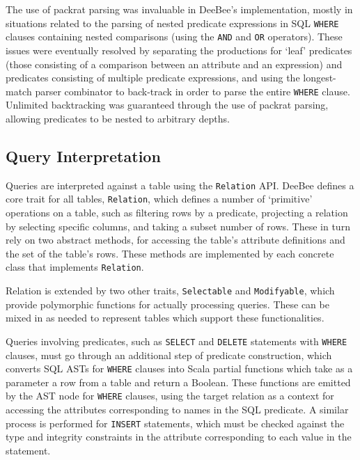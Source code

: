 The use of packrat parsing was invaluable in DeeBee's implementation, mostly in situations related to the parsing of nested predicate expressions in SQL \texttt{WHERE} clauses containing nested comparisons (using the \texttt{AND} and \texttt{OR} operators). These issues were eventually resolved by separating the productions for `leaf' predicates (those consisting of a comparison between an attribute and an expression) and predicates consisting of multiple predicate expressions, and using the longest-match parser combinator to back-track in order to parse the entire \texttt{WHERE} clause. Unlimited backtracking was guaranteed through the use of packrat parsing, allowing predicates to be nested to arbitrary depths.
\FloatBarrier
\subsection{Query Interpretation}
\label{sec:query}
Queries are interpreted against a table using the \texttt{Relation} API. DeeBee defines a core trait for all tables, \texttt{Relation}, which defines a number of `primitive' operations on a table, such as filtering rows by a predicate, projecting a relation by selecting specific columns, and taking a subset number of rows. These in turn rely on two abstract methods, for accessing the table's attribute definitions and the set of the table's rows. These methods are implemented by each concrete class that implements \texttt{Relation}.

Relation is extended by two other traits, \texttt{Selectable} and \texttt{Modifyable}, which provide polymorphic functions for actually processing queries. These can be mixed in as needed to represent tables which support these functionalities.

Queries involving predicates, such as \texttt{SELECT} and \texttt{DELETE} statements with \texttt{WHERE} clauses, must go through an additional step of predicate construction, which converts SQL ASTs for \texttt{WHERE} clauses into Scala partial functions which take as a parameter a row from a table and return a Boolean. These functions are emitted by the AST node for \texttt{WHERE} clauses, using the target relation as a context for accessing the attributes corresponding to names in the SQL predicate. A similar process is performed for \texttt{INSERT} statements, which must be checked against the type and integrity constraints in the attribute corresponding to each value in the statement.

